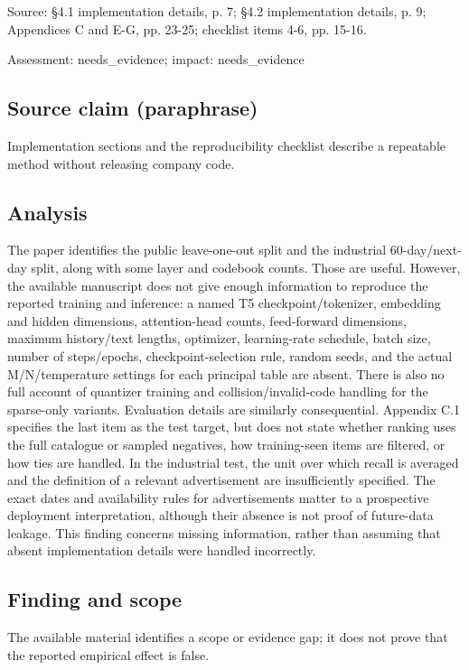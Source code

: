 \documentclass[11pt]{article}
\begin{document}
Source: §4.1 implementation details, p. 7; §4.2 implementation details, p. 9; Appendices C and E-G, pp. 23-25; checklist items 4-6, pp. 15-16.

Assessment: needs\_evidence; impact: needs\_evidence

\subsection*{Source claim (paraphrase)}

Implementation sections and the reproducibility checklist describe a repeatable method without releasing company code.

\subsection*{Analysis}

The paper identifies the public leave-one-out split and the industrial \(60\)-day/next-day split, along with some layer and codebook counts. Those are useful. However, the available manuscript does not give enough information to reproduce the reported training and inference: a named T5 checkpoint/tokenizer, embedding and hidden dimensions, attention-head counts, feed-forward dimensions, maximum history/text lengths, optimizer, learning-rate schedule, batch size, number of steps/epochs, checkpoint-selection rule, random seeds, and the actual M/N/temperature settings for each principal table are absent. There is also no full account of quantizer training and collision/invalid-code handling for the sparse-only variants. Evaluation details are similarly consequential. Appendix C.1 specifies the last item as the test target, but does not state whether ranking uses the full catalogue or sampled negatives, how training-seen items are filtered, or how ties are handled. In the industrial test, the unit over which recall is averaged and the definition of a relevant advertisement are insufficiently specified. The exact dates and availability rules for advertisements matter to a prospective deployment interpretation, although their absence is not proof of future-data leakage. This finding concerns missing information, rather than assuming that absent implementation details were handled incorrectly.

\subsection*{Finding and scope}

The available material identifies a scope or evidence gap; it does not prove that the reported empirical effect is false.
\end{document}
